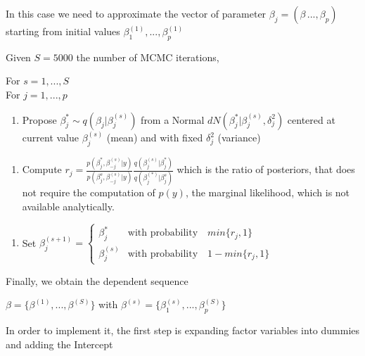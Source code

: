 \documentclass[
]{article}
\providecommand{\tightlist}{%
  \setlength{\itemsep}{0pt}\setlength{\parskip}{0pt}}
\begin{document}
In this case we need to approximate the vector of parameter
\(\beta_j = (\beta_\,...,\beta_p)\) starting from initial values
\(\beta_1^{(1)},...,\beta_p^{(1)}\)

Given \(S = 5000\) the number of MCMC iterations,

For \(s = 1,...,S\)\\
\hspace*{0.333em}\hspace*{0.333em}\hspace*{0.333em}For \(j = 1,...,p\)

\begin{enumerate}
\def\labelenumi{\arabic{enumi}.}
\tightlist
\item
  Propose \(\beta^*_j \sim q(\beta_j|\beta_j^{(s)})\) from a Normal
  \(dN(\beta_j^*| \beta_j^{(s)},\delta^2_j)\) centered at current value
  \(\beta_j^{(s)}\) (mean) and with fixed \(\delta^2_j\) (variance)
\end{enumerate}

\begin{enumerate}
\def\labelenumi{\arabic{enumi}.}
\setcounter{enumi}{1}
\tightlist
\item
  Compute
  \(r_j = \frac{p(\beta_j^*,\beta_{-j}^{(s)} | y)}{p(\beta_j^s,\beta_{-j}^{(s)} | y)} \frac{q(\beta_j^{(s)} | \beta_j^*)}{q(\beta_j^{(*)} | \beta_j^s)}\)
  which is the ratio of posteriors, that does not require the
  computation of \(p(y)\), the marginal likelihood, which is not
  available analytically.
\end{enumerate}

\begin{enumerate}
\def\labelenumi{\arabic{enumi}.}
\setcounter{enumi}{2}
\tightlist
\item
  Set
  \(\beta_j^{(s+1)} = \begin{cases} \beta_j^* & \mbox{with probability} \quad min\{r_j,1\} \\ \beta_j^{(s)} & \mbox{with probability} \quad 1 - min\{r_j,1\} \end{cases}\)
\end{enumerate}

Finally, we obtain the dependent sequence

\(\beta = \{\beta^{(1)},...,\beta^{(S)}\}\) with
\(\beta^{(s)} = \{\beta^{(s)}_1,...,\beta^{(S)}_p\}\)

In order to implement it, the first step is expanding factor variables
into dummies and adding the Intercept
\end{document}
